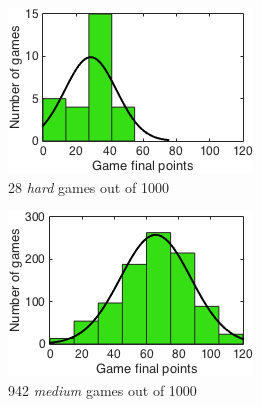 \begin{figure}[h]
        \centering
        \begin{subfigure}[h]{0.32\textwidth}
                \includegraphics[width=\textwidth]{./img/appendix/histIhard}
                \caption{28 \emph{hard} games out of 1000}
                \label{app:histIhard}
        \end{subfigure}
        \begin{subfigure}[h]{0.32\textwidth}
                \includegraphics[width=\textwidth]{./img/appendix/histImedium}
                \caption{942 \emph{medium} games out of 1000}
                \label{app:histImedium}
        \end{subfigure}
        \begin{subfigure}[h]{0.32\textwidth}

\end{subfigure}
\end{figure}
